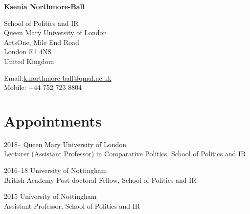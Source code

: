 \documentclass[12pt,letterpaper]{report}
\newcommand{\myname}{Ksenia Northmore-Ball}
\newcommand{\namefont}[1]{{\normalfont\bfseries\Huge{#1}}}
\begin{document}

    \namefont{\myname}

    \vspace{1em}
    \begin{minipage}[t]{0.700\textwidth}
        School of Politics and IR \\
        Queen Mary University of London \\
        ArtsOne, Mile End Road \\
        London E1 4NS \\
        United Kingdom
    \end{minipage}
    \begin{minipage}[t]{0.5\textwidth}
       
        
        Email:\href{mailto:k.northmore-ball@qmul.ac.uk}{k.northmore-ball@qmul.ac.uk} \\
        Mobile: +44 752 723 8804 \\
  
    \end{minipage}





    \section*{Appointments}

    \begin{tablist}

        \item[2018--]   \tab{}Queen Mary University of London \\
                             Lecturer (Assistant Professor) in Comparative Politics, School of Politics and IR\\

        \item[2016--18] \tab{}University of Nottingham \\
                             British Academy Post-doctoral Fellow, School of Politics and IR \\

        \item[2015] \tab{}University of Nottingham \\
                             Assistant Professor, School of Politics and IR \\

    \end{tablist}
\end{document}
